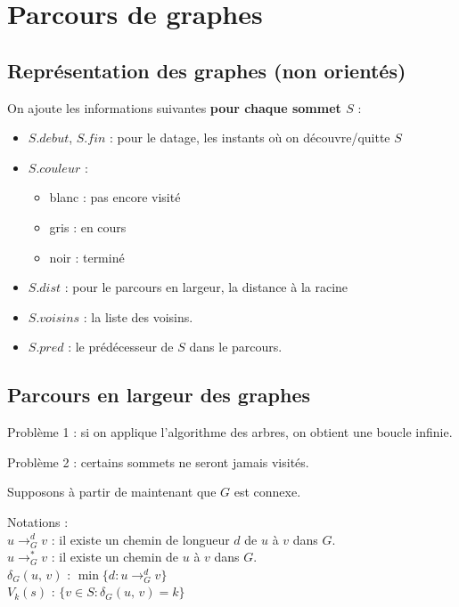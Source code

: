 
\chapter{Parcours de graphes}

\section{Représentation des graphes (non orientés)}

On ajoute les informations suivantes \textbf{pour chaque sommet $S$} :

\begin{itemize}
\item \textcolor{ocre}{$S.debut$, $S.fin$} : pour le datage, les instants où on découvre/quitte $S$
\item \textcolor{ocre}{$S.couleur$} :
	\begin{itemize}
		\item blanc : pas encore visité
		\item gris : en cours
		\item noir : terminé
	\end{itemize}
\item \textcolor{ocre}{$S.dist$} : pour le parcours en largeur, la distance à la racine
\item \textcolor{ocre}{$S.voisins$} : la liste des voisins.
\item \textcolor{ocre}{$S.pred$} : le prédécesseur de $S$ dans le parcours.
\end{itemize}



\section{Parcours en largeur des graphes}

\textcolor{ocre}{Problème 1} : si on applique l'algorithme des arbres, on obtient une boucle infinie.

\textcolor{ocre}{Problème 2} : certains sommets ne seront jamais visités.

Supposons à partir de maintenant que $G$ est connexe.

\begin{definition}[Chemins] Notations : \\
$u \rightarrow^{d}_{G} v$ : il existe un chemin de longueur $d$ de $u$ à $v$ dans $G$.\\
$u \rightarrow^{\ast}_{G} v$ : il existe un chemin de $u$ à $v$ dans $G$.\\
$\delta_{G}(u,\, v)$ : $\min \lbrace d : u \rightarrow^{d}_{G} v \rbrace$\\
$V_{k}(s)$ : $\lbrace v \in S : \delta_{G}(u,\, v) = k\rbrace$
\end{definition}

